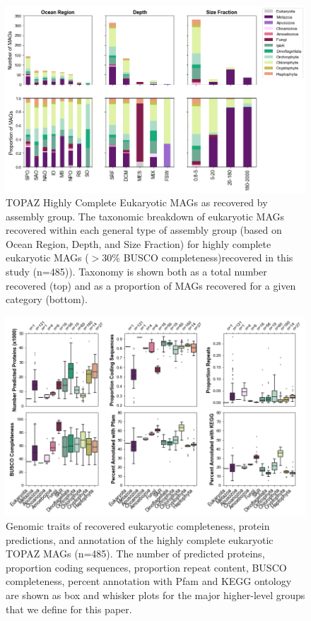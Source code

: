 \documentclass[12pt]{article}
\numberwithin{equation}{section}
\begin{document}
\begin{landscape}
\begin{figure}
    \centering
    \includegraphics[width=0.95\columnwidth]{si-figures/HQ_MAG_distributions.png}
    \caption{TOPAZ Highly Complete Eukaryotic MAGs as recovered by assembly group. The taxonomic breakdown of eukaryotic MAGs recovered within each general type of assembly group (based on Ocean Region, Depth, and Size Fraction) for highly complete eukaryotic MAGs ($>30\%$ BUSCO completeness)recovered in this study (n=485)). Taxonomy is shown both as a total number recovered (top) and as a proportion of MAGs recovered for a given category (bottom). }
    \label{fig:hq-dist}
\end{figure}
\end{landscape}


\begin{landscape}
\begin{figure}
    \centering
    \includegraphics[width=0.9\columnwidth]{si-figures/HQ_MAG_protein_bar_plots.png}
    \caption{Genomic traits of recovered eukaryotic completeness, protein predictions, and annotation of the highly complete eukaryotic TOPAZ MAGs (n=485). The number of predicted proteins, proportion coding sequences, proportion repeat content, BUSCO completeness, percent annotation with Pfam and KEGG ontology are shown as box and whisker plots for the major higher-level groups that we define for this paper.}
    \label{fig:hq-prot-bar}
\end{figure}
\end{landscape}
\end{document}
